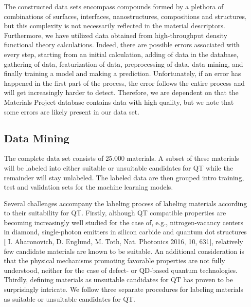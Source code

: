 \documentclass[superscriptaddress,unsortedaddress,
 amsmath,amssymb,
 aps,
]{revtex4-2}
\begin{document}
The constructed data sets encompass compounds formed by a plethora of combinations of surfaces, interfaces, nanostructures, compositions and structures, but this complexity is not necessarily reflected in the material descriptors. 
Furthermore, we have utilized data obtained from high-throughput density functional theory calculations. Indeed, there are possible errors associated with every step, starting from an initial calculation, adding of data in the database, gathering of data, featurization of data, preprocessing of data, data mining, and finally training a model and making a prediction. Unfortunately, if an error has happened in the first part of the process, the error follows the entire process and will get increasingly harder to detect. Therefore, we are dependent on that the Materials Project database contains data with high quality, but we note that some errors are likely present in our data set. 

\subsection*{Data Mining}
The complete data set consists of $25.000$ materials. A subset of these materials will be labeled into either suitable or unsuitable candidates for QT while the remainder will stay unlabeled. The labeled data are then grouped intro training, test and validation sets for the machine learning models. 

Several challenges accompany the labeling process of labeling materials according to their suitability for QT. 
Firstly, although QT compatible properties are becoming increasingly well studied for the case of, e.g., nitrogen-vacancy centers in diamond, single-photon emitters in silicon carbide and quantum dot structures \cite{Bathen2021}[ I. Aharonovich, D. Englund, M. Toth, Nat. Photonics 2016, 10, 631], relatively few candidate materials are known to be suitable. An additional consideration is that the physical mechanisms promoting favorable properties are not fully understood, neither for the case of defect- or QD-based quantum technologies. Thirdly, defining materials as unsuitable candidates for QT has proven to be surprisingly intricate. 
We follow three separate procedures for labeling materials as suitable or unsuitable candidates for QT. 
\end{document}
